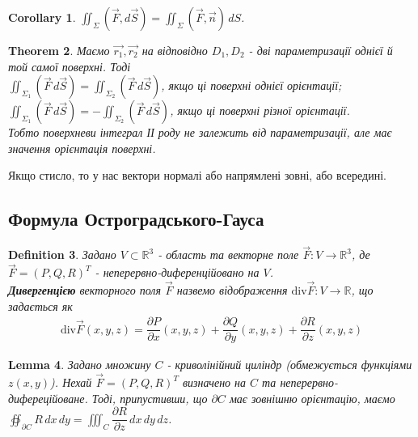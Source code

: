 \documentclass[a4paper, 10pt]{article}
\def\departial#1#2{\dfrac{\partial {#1}}{\partial {#2}}}
\theoremstyle{theoremdd}
\newtheorem{theorem}{Theorem}[subsection]
\theoremstyle{theoremdd}
\newtheorem{definition}[theorem]{Definition}
\theoremstyle{theoremdd}
\theoremstyle{theoremdd}
\theoremstyle{theoremdd}
\theoremstyle{theoremdd}
\theoremstyle{theoremdd}
\theoremstyle{theoremdd}
\theoremstyle{theoremdd}
\theoremstyle{theoremdd}
\theoremstyle{theoremdd}
\theoremstyle{theoremdd}
\theoremstyle{theoremdd}
\newtheorem{lemma}[theorem]{Lemma}
\theoremstyle{theoremdd}
\newtheorem{corollary}[theorem]{Corollary}
\theoremstyle{theoremdd}
\begin{document}
\begin{corollary}
$\displaystyle\iint_\Sigma (\vec{F}, d\vec{S}) = \iint_\Sigma (\vec{F}, \vec{n})\,dS$.
\end{corollary}

\begin{theorem}
Маємо $\vec{r_1},\vec{r_2}$ на відповідно $D_1, D_2$ - дві параметризації однієї й той самої поверхні. Тоді\\
$\displaystyle\iint_{\Sigma_1} (\vec{F}\,d\vec{S}) = \iint_{\Sigma_2} (\vec{F}\,d\vec{S})$, якщо ці поверхні однієї орієнтації;\\
$\displaystyle\iint_{\Sigma_1 } (\vec{F}\,d\vec{S}) = -\iint_{\Sigma_2} (\vec{F}\,d\vec{S})$, якщо ці поверхні різної орієнтації.\\
Тобто поверхневи інтеграл ІІ роду не залежить від параметризації, але має значення орієнтація поверхні.
\end{theorem}

Якщо стисло, то у нас вектори нормалі або напрямлені зовні, або всередині.

\subsection{Формула Остроградського-Гауса}
\begin{definition}
Задано $V \subset \mathbb{R}^3$ - область та векторне поле $\vec{F}: V \to \mathbb{R}^3$, де $\vec{F} = (P,Q,R)^T$ - неперервно-диференційовано на $V$.\\
\textbf{Дивергенцією} векторного поля $\vec{F}$ назвемо відображення $\text{div} \vec{F}: V \to \mathbb{R}$, що задається як
\begin{align*}
\text{div} \vec{F}(x,y,z) = \departial{P}{x}(x,y,z) + \departial{Q}{y}(x,y,z) + \departial{R}{z}(x,y,z)
\end{align*}
\end{definition}

\begin{lemma}
Задано множину $C$ - криволінійний циліндр (обмежується функціями $z(x,y)$). Нехай $\vec{F} = (P,Q,R)^T$ визначено на $C$ та неперервно-дифереційоване. Тоді, припустивши, що $\partial  C$ має зовнішню орієнтацію, маємо\\
$\displaystyle\oiint_{\partial C} R\,dx\,dy = \iiint_C \departial{R}{z}\,dx\,dy\,dz$.
\end{lemma}
\end{document}
